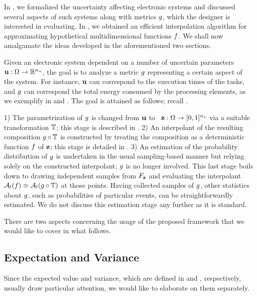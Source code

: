 In , we formalized the uncertainty affecting electronic systems
and discussed several aspects of such systems along with metrics $g$, which the
designer is interested in evaluating. In , we obtained an
efficient interpolation algorithm for approximating hypothetical
multidimensional functions $f$. We shall now amalgamate the ideas developed in
the aforementioned two sections.

Given an electronic system dependent on a number of uncertain parameters $\mathbf{u}:
\Omega \to \mathbb{R}^{n_u}$, the goal is to analyze a metric $g$ representing a
certain aspect of the system. For instance, $\mathbf{u}$ can correspond to the
execution times of the tasks, and $g$ can correspond the total energy consumed
by the processing elements, as we exemplify in  and . The
goal is attained as follows; recall .

1) The parametrization of $g$ is changed from $\mathbf{u}$ to \rvs\ $\mathbf{z}: \Omega
\to [0, 1]^{n_z}$ via a suitable transformation $\mathbb{T}$; this stage is
described in . 2) An interpolant of the resulting composition
$g \circ \mathbb{T}$ is constructed by treating the composition as a
deterministic function $f$ of $\mathbf{z}$; this stage is detailed in
. 3) An estimation of the probability distribution of $g$
is undertaken in the usual sampling-based manner but relying solely on the
constructed interpolant; $g$ is no longer involved. This last stage boils down
to drawing independent samples from $F_{\mathbf{z}}$ and evaluating the
interpolant $\mathcal{A}_{l}(f) \equiv \mathcal{A}_{l}(g \circ
\mathbb{T})$ at those points. Having collected samples of $g$, other
statistics about $g$, such as probabilities of particular events, can be
straightforwardly estimated. We do not discuss this estimation stage any further
as it is standard.

There are two aspects concerning the usage of the proposed framework that we
would like to cover in what follows.

\subsection{Expectation and Variance} 
Since the expected value and variance, which are defined in 
and , respectively, usually draw particular attention, we would
like to elaborate on them separately.

